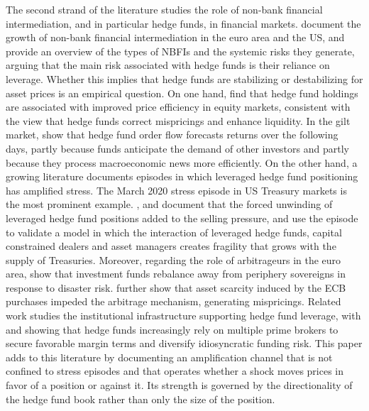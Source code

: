 \documentclass[english, 11pt, oneside]{article}
\begin{document}
The second strand of the literature studies the role of non-bank financial intermediation, and in particular hedge funds, in financial markets. \citet{pelizzon2025nbfi} document the growth of non-bank financial intermediation in the euro area and the US, and \citet{aramonte2023} provide an overview of the types of NBFIs and the systemic risks they generate, arguing that the main risk associated with hedge funds is their reliance on leverage. Whether this implies that hedge funds are stabilizing or destabilizing for asset prices is an empirical question. On one hand, \citet{cao2018} find that hedge fund holdings are associated with improved price efficiency in equity markets, consistent with the view that hedge funds correct mispricings and enhance liquidity. In the gilt market, \citet{czech2021} show that hedge fund order flow forecasts returns over the following days, partly because funds anticipate the demand of other investors and partly because they process macroeconomic news more efficiently. On the other hand, a growing literature documents episodes in which leveraged hedge fund positioning has amplified stress. The March 2020 stress episode in US Treasury markets is the most prominent example. \citet{barth2025}, \citet{kruttli2025} and \citet{barone2023} document that the forced unwinding of leveraged hedge fund positions added to the selling pressure, and \citet{kashyap2025} use the episode to validate a model in which the interaction of leveraged hedge funds, capital constrained dealers and asset managers creates fragility that grows with the supply of Treasuries. Moreover, regarding the role of arbitrageurs in the euro area, \citet{anaya2025} show that investment funds rebalance away from periphery sovereigns in response to disaster risk. \citet{pelizzon2025} further show that asset scarcity induced by the ECB purchases impeded the arbitrage mechanism, generating mispricings. Related work studies the institutional infrastructure supporting hedge fund leverage, with \citet{dahlquist2023} and \citet{bittner2025} showing that hedge funds increasingly rely on multiple prime brokers to secure favorable margin terms and diversify idiosyncratic funding risk. This paper adds to this literature by documenting an amplification channel that is not confined to stress episodes and that operates whether a shock moves prices in favor of a position or against it. Its strength is governed by the directionality of the hedge fund book rather than only the size of the position.
\end{document}
